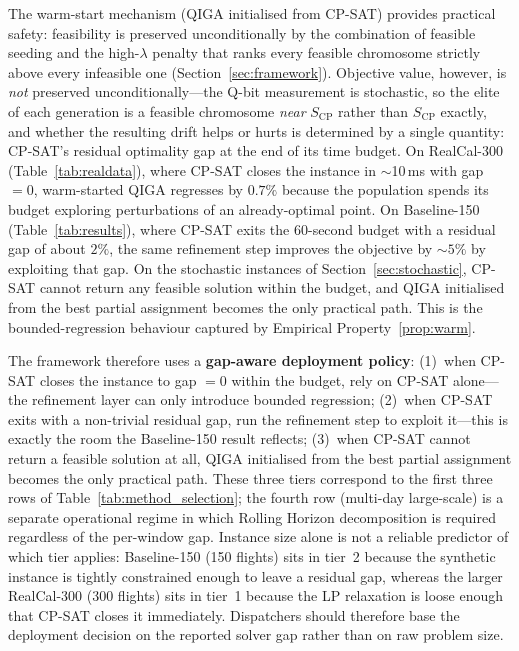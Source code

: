 \documentclass[12pt,number]{elsarticle}
\begin{document}
The warm-start mechanism (QIGA initialised from CP-SAT) provides practical safety: feasibility is preserved unconditionally by the combination of feasible seeding and the high-$\lambda$ penalty that ranks every feasible chromosome strictly above every infeasible one (Section~\ref{sec:framework}). Objective value, however, is \emph{not} preserved unconditionally---the Q-bit measurement is stochastic, so the elite of each generation is a feasible chromosome \emph{near} $S_{\mathrm{CP}}$ rather than $S_{\mathrm{CP}}$ exactly, and whether the resulting drift helps or hurts is determined by a single quantity: CP-SAT's residual optimality gap at the end of its time budget. On RealCal-300 (Table~\ref{tab:realdata}), where CP-SAT closes the instance in $\sim$10\,ms with gap $=0$, warm-started QIGA regresses by $0.7\%$ because the population spends its budget exploring perturbations of an already-optimal point. On Baseline-150 (Table~\ref{tab:results}), where CP-SAT exits the 60-second budget with a residual gap of about $2\%$, the same refinement step improves the objective by $\sim 5\%$ by exploiting that gap. On the stochastic instances of Section~\ref{sec:stochastic}, CP-SAT cannot return any feasible solution within the budget, and QIGA initialised from the best partial assignment becomes the only practical path. This is the bounded-regression behaviour captured by Empirical Property~\ref{prop:warm}.

The framework therefore uses a \textbf{gap-aware deployment policy}: (1)~when CP-SAT closes the instance to gap $=0$ within the budget, rely on CP-SAT alone---the refinement layer can only introduce bounded regression; (2)~when CP-SAT exits with a non-trivial residual gap, run the refinement step to exploit it---this is exactly the room the Baseline-150 result reflects; (3)~when CP-SAT cannot return a feasible solution at all, QIGA initialised from the best partial assignment becomes the only practical path. These three tiers correspond to the first three rows of Table~\ref{tab:method_selection}; the fourth row (multi-day large-scale) is a separate operational regime in which Rolling Horizon decomposition is required regardless of the per-window gap. Instance size alone is not a reliable predictor of which tier applies: Baseline-150 (150 flights) sits in tier~2 because the synthetic instance is tightly constrained enough to leave a residual gap, whereas the larger RealCal-300 (300 flights) sits in tier~1 because the LP relaxation is loose enough that CP-SAT closes it immediately. Dispatchers should therefore base the deployment decision on the reported solver gap rather than on raw problem size.
\end{document}
